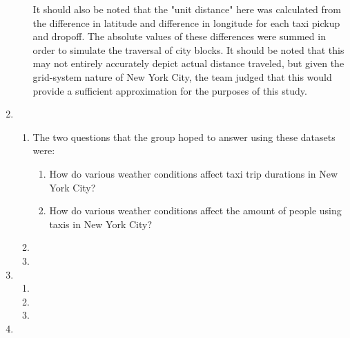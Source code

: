 \documentclass{article}
\begin{document}
\begin{enumerate}
\begin{enumerate}
        It should also be noted that the "unit distance" here was calculated from the difference in latitude and difference in longitude for each taxi pickup and dropoff. The absolute values of these differences were summed in order to simulate the traversal of city blocks. It should be noted that this may not entirely accurately depict actual distance traveled, but given the grid-system nature of New York City, the team judged that this would provide a sufficient approximation for the purposes of this study.


    \end{enumerate}

    \item %
    \begin{enumerate}

        \item %
        
        The two questions that the group hoped to answer using these datasets were:
        
        \begin{enumerate}
            \item
            How do various weather conditions affect taxi trip durations in New York City?
            
            \item
            How do various weather conditions affect the amount of people using taxis in New York City?
            
        \end{enumerate}
        


        \item %


        \item %


    \end{enumerate}

    \item %
    \begin{enumerate}

        \item %


        \item %


        \item %


    \end{enumerate}

    \item %



\end{enumerate}
\end{document}
